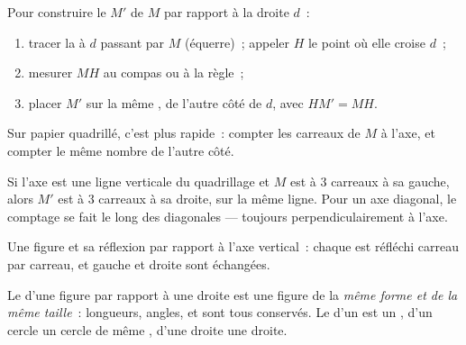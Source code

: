 \begin{method}\label{met:g6:symmetry:construct}
Pour construire le  $M'$ de $M$ par rapport à la droite
$d$~:
\begin{enumerate}
  \item tracer la  à $d$ passant par $M$ (équerre)~;
        appeler $H$ le point où elle croise $d$~;
  \item mesurer $MH$ au compas ou à la règle~;
  \item placer $M'$ sur la même , de l'autre côté de
        $d$, avec $HM' = MH$.
\end{enumerate}
Sur papier quadrillé, c'est plus rapide~: compter les carreaux de $M$
à l'axe, et compter le même nombre de l'autre côté.
\end{method}

\begin{example}\label{ex:g6:symmetry:grid}
Si l'axe est une ligne verticale du quadrillage et $M$ est à
$3$ carreaux à sa gauche, alors $M'$ est à $3$ carreaux à sa droite,
sur la même ligne. Pour un axe diagonal, le comptage se fait le long
des diagonales --- toujours perpendiculairement à l'axe.
\end{example}

\begin{omfigure}

{\small Une figure et sa réflexion par rapport à l'axe vertical~:
chaque  est réfléchi carreau par carreau, et gauche et droite
sont échangées.}
\end{omfigure}

\begin{proposition}\label{prop:g6:symmetry:preserved}
Le  d'une figure par rapport à une droite est une figure de
la \emph{même forme et de la même taille}~: longueurs, angles,
 et  sont tous conservés. Le  d'un 
est un , d'un cercle un cercle de même , d'une droite une
droite.
\end{proposition}
\admitted

